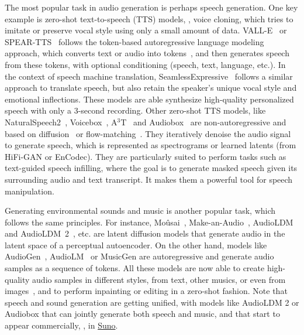 The most popular task in audio generation is perhaps speech generation.
One key example is zero-shot text-to-speech (\Gls*{TTS}) models, \aka, voice cloning, which tries to imitate or preserve vocal style using only a small amount of data. 
VALL-E~\citep{wang2023neural} or SPEAR-TTS~\citep{kharitonov2023speak} follows the token-based autoregressive language modeling approach, which converts text or audio into tokens~\citep{defossez2022high,soundstream}, and then generates speech from these tokens, with optional conditioning (speech, text, language, etc.). 
In the context of speech machine translation, SeamlessExpressive~\citep{seamless2023} follows a similar approach to translate speech, but also retain the speaker's unique vocal style and emotional inflections.
These models are able synthesize high-quality personalized speech with only a 3-second recording. 
Other zero-shot TTS models, like NaturalSpeech2~\citep{shen_naturalspeech2}, Voicebox~\citep{le2023voicebox}, A$^{3}$T~\citep{BaiZCML022_A3T} and Audiobox~\citep{hsu2023audiobox} are non-autoregressive and based on diffusion~\citep{ho2020denoising} or flow-matching~\citep{lipman2022flow}.
They iteratively denoise the audio signal to generate speech, which is represented as spectrograms or learned latents (from HiFi-GAN or EnCodec).
They are particularly suited to perform tasks such as text-guided speech infilling, where the goal is to generate masked speech given its surrounding audio and text transcript. 
It makes them a powerful tool for speech manipulation.

Generating environmental sounds and music is another popular task, which follows the same principles.
For instance, Mo\^usai~\citep{schneider2023mo}, Make-an-Audio~\citep{huang2023make}, AudioLDM~\citep{liu2023audioldm} and AudioLDM~2~\citep{liu2024audioldm}, etc. are latent diffusion models that generate audio in the latent space of a perceptual autoencoder.
On the other hand, models like AudioGen~\citep{kreuk2022audiogen}, AudioLM~\citep{agostinelli2023musiclm} or MusicGen are autoregressive and generate audio samples as a sequence of tokens.
All these models are now able to create high-quality audio samples in different styles, from text, other musics, or even from images~\citep{girdhar2023imagebind}, and to perform inpainting or editing in a zero-shot fashion.
Note that speech and sound generation are getting unified, with models like AudioLDM 2 or Audiobox that can jointly generate both speech and music, and that start to appear commercially, \eg, in \href{https://www.suno.ai/}{Suno}.










